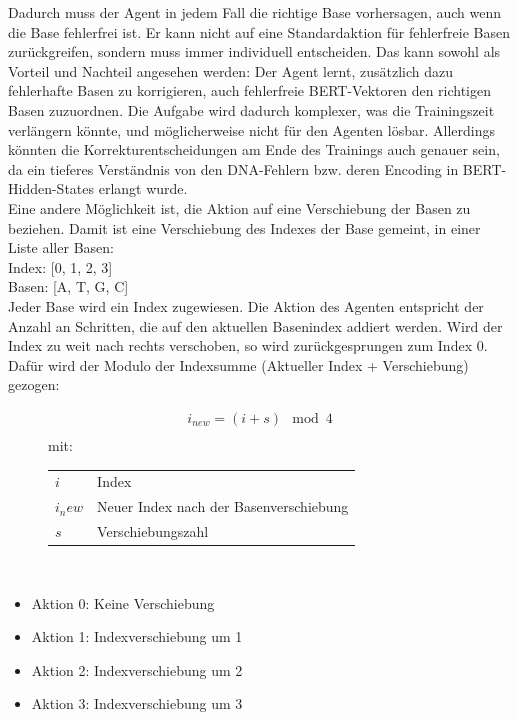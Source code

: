 \documentclass[oneside,bibliography=totocnumbered,BCOR=5mm]{scrbook}%
\makeatletter
\theoremstyle{definition}
\theoremstyle{definition}
\theoremstyle{definition}
\theoremstyle{definition}
\theoremstyle{definition}
\theoremstyle{definition}
\newenvironment{conditions}[1][mit:]
  {#1 \begin{tabular}[t]{>{$}l<{$} @{${}={}$} l}}
  {\end{tabular}\\[\belowdisplayskip]}
\makeatother
\begin{document}
Dadurch muss der Agent in jedem Fall die richtige Base vorhersagen, auch wenn die Base fehlerfrei ist.
Er kann nicht auf eine Standardaktion für fehlerfreie Basen zurückgreifen, sondern muss immer individuell entscheiden.
Das kann sowohl als Vorteil und Nachteil angesehen werden: 
Der Agent lernt, zusätzlich dazu fehlerhafte Basen zu korrigieren,
auch fehlerfreie BERT-Vektoren den richtigen Basen zuzuordnen.
Die Aufgabe wird dadurch komplexer, was die Trainingszeit verlängern könnte, und möglicherweise nicht für den Agenten lösbar.
Allerdings könnten die Korrekturentscheidungen
am Ende des Trainings auch genauer sein, da ein tieferes Verständnis von den DNA-Fehlern bzw. deren Encoding in BERT-Hidden-States erlangt wurde.\\

Eine andere Möglichkeit ist, die Aktion auf eine Verschiebung der Basen zu beziehen. 
Damit ist eine Verschiebung des Indexes der Base gemeint, in einer Liste aller Basen:\\

Index: [0, 1, 2, 3]\\
Basen: [A, T, G, C]\\

Jeder Base wird ein Index zugewiesen. Die Aktion des Agenten entspricht der Anzahl an Schritten, die auf den aktuellen Basenindex
addiert werden. Wird der Index zu weit nach rechts verschoben, so wird zurückgesprungen zum Index 0. 
Dafür wird der Modulo der Indexsumme (Aktueller Index + Verschiebung) gezogen:\\

\newpage

\begin{figure}[h]
\begin{align*}
i_{new} = (i + s)\mod 4\\
\end{align*}
\begin{conditions}
  i      & Index \\
  i_new  & Neuer Index nach der Basenverschiebung \\
  s      & Verschiebungszahl \\
\end{conditions}
\end{figure}

\begin{itemize}
  \item Aktion 0: Keine Verschiebung
  \item Aktion 1: Indexverschiebung um 1
  \item Aktion 2: Indexverschiebung um 2
  \item Aktion 3: Indexverschiebung um 3
\end{itemize}
\end{document}
